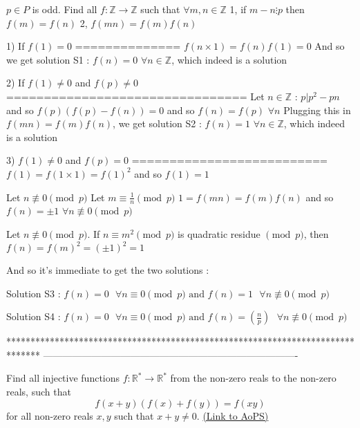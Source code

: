 \begin{solution}
	\begin{tcolorbox}$p \in P$ is odd. Find all $f:\mathbb{Z} \to \mathbb{Z}$ such that $\forall m,n \in \mathbb{Z}$
1, if $m -n \vdots p$ then $f(m)=f(n)$
2, $f(mn)=f(m)f(n)$\end{tcolorbox}
1) If $f(1)=0$
==============
$f(n\times 1)=f(n)f(1)=0$ 
And so we get solution S1 : $\boxed{f(n)=0}$ $\forall n\in\mathbb Z$, which indeed is a solution

2) If $f(1)\ne 0$ and $f(p)\ne 0$
================================
Let $n\in\mathbb Z$ : $p|p^2-pn$ and so $f(p)(f(p)-f(n))=0$ and so $f(n)=f(p)$ $\forall n$
Plugging this in $f(mn)=f(m)f(n)$, we get solution S2 : $\boxed{f(n)=1}$ $\forall n\in\mathbb Z$, which indeed is a solution

3) $f(1)\ne 0$ and $f(p)=0$
==========================
$f(1)=f(1\times 1)=f(1)^2$ and so $f(1)=1$

Let $n\not\equiv 0\pmod p$ 
Let $m\equiv \frac 1n\pmod p$
$1=f(mn)=f(m)f(n)$ and so $f(n)=\pm 1$ $\forall n\not\equiv 0\pmod p$

Let $n\not\equiv 0\pmod p$. If $n\equiv m^2\pmod p$ is quadratic residue $\pmod p$, then $f(n)=f(m)^2=(\pm 1)^2=1$

And so it's immediate to get the two solutions :

Solution S3 : $\boxed{f(n)=0\text{   }\forall n\equiv 0\pmod p\text{ and  }f(n)=1\text{   }\forall n\not\equiv 0\pmod p}$

Solution S4 : $\boxed{f(n)=0\text{   }\forall n\equiv 0\pmod p\text{ and  }f(n)=\left(\frac np\right)\text{   }\forall n\not\equiv 0\pmod p}$
\end{solution}
*******************************************************************************
-------------------------------------------------------------------------------

\begin{problem}
	Find all injective functions $f: \mathbb{R}^* \to \mathbb{R}^* $ from the non-zero reals to the non-zero reals, such that \[f(x+y) \left(f(x) + f(y)\right) = f(xy)\] for all non-zero reals $x, y$ such that $x+y \neq 0$.
	\flushright \href{https://artofproblemsolving.com/community/c6h559598}{(Link to AoPS)}
\end{problem}



